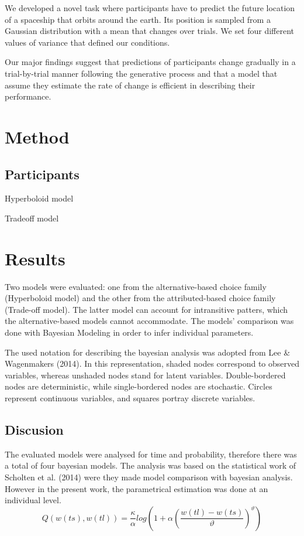 \documentclass[jou,apacite]{apa6}
\begin{document}
We developed a novel task where participants have to predict the future location of a spaceship that orbits around the earth. Its position is sampled from a Gaussian distribution with a mean that changes over trials. We set four different values of variance that defined our conditions. 

Our major findings suggest that predictions of participants change gradually in a trial-by-trial manner following the generative process and that a model that assume they estimate the rate of change is efficient in describing their performance. 


\section{Method}

\subsection{Participants}
Hyperboloid model

Tradeoff model 





\section{Results}

Two models were evaluated: one from the alternative-based choice family (Hyperboloid model) and the other from the attributed-based choice family (Trade-off model). The latter model can account for intransitive patters, which the alternative-based models cannot accommodate. The models' comparison was done with Bayesian Modeling in order to infer individual parameters. 

The used notation for describing the bayesian analysis was adopted from Lee \& Wagenmakers (2014). In this representation, shaded nodes correspond to observed variables, whereas unshaded nodes stand for latent variables. Double-bordered nodes are deterministic, while single-bordered nodes are stochastic. Circles represent continuous variables, and squares portray discrete variables. 

\subsection{Discusion}

The evaluated models were analysed for time and probability, therefore there was a total of four bayesian models. The analysis was based on the statistical work of Scholten et al. (2014) were they made model comparison with bayesian analysis. However in the present work, the parametrical estimation was done at an individual level. 
\begin{equation}
Q(w(ts),w(tl))= \frac{\kappa}{\alpha} log\left(1+\alpha \left(\frac{w(tl)-w(ts)}{\vartheta}\right) ^\vartheta \right)
\end{equation}
\end{document}
